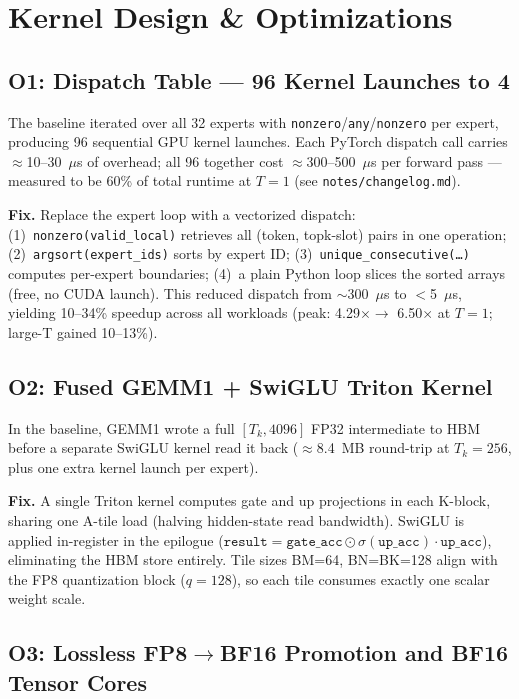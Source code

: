 \section{Kernel Design \& Optimizations}
\label{sec:design}

\subsection{O1: Dispatch Table --- 96 Kernel Launches to 4}

The baseline iterated over all 32 experts with \texttt{nonzero}/\texttt{any}/\texttt{nonzero} per expert, producing 96 sequential GPU kernel launches.
Each PyTorch dispatch call carries ${\approx}$10--30~$\mu$s of overhead; all 96 together cost ${\approx}$300--500~$\mu$s per forward pass --- measured to be 60\% of total runtime at $T{=}1$ (see \texttt{notes/changelog.md}).

\textbf{Fix.} Replace the expert loop with a vectorized dispatch:
(1)~\texttt{nonzero(valid\_local)} retrieves all (token, topk-slot) pairs in one operation;
(2)~\texttt{argsort(expert\_ids)} sorts by expert ID;
(3)~\texttt{unique\_consecutive(\ldots)} computes per-expert boundaries;
(4)~a plain Python loop slices the sorted arrays (free, no CUDA launch).
This reduced dispatch from ${\sim}$300~$\mu$s to ${<}$5~$\mu$s, yielding 10--34\% speedup across all workloads (peak: 4.29$\times \to$ 6.50$\times$ at $T{=}1$; large-T gained 10--13\%).

\subsection{O2: Fused GEMM1 + SwiGLU Triton Kernel}

In the baseline, GEMM1 wrote a full $[T_k, 4096]$ FP32 intermediate to HBM before a separate SwiGLU kernel read it back (${\approx}$8.4~MB round-trip at $T_k{=}256$, plus one extra kernel launch per expert).

\textbf{Fix.} A single Triton kernel computes gate and up projections in each K-block,
sharing one A-tile load (halving hidden-state read bandwidth).
SwiGLU is applied in-register in the epilogue ($\texttt{result} = \texttt{gate\_acc} \odot \sigma(\texttt{up\_acc}) \cdot \texttt{up\_acc}$), eliminating the HBM store entirely.
Tile sizes BM=64, BN=BK=128 align with the FP8 quantization block ($q{=}128$), so each tile consumes exactly one scalar weight scale.

\subsection{O3: Lossless FP8$\to$BF16 Promotion and BF16 Tensor Cores}

